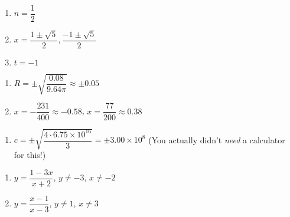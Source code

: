 \documentclass[11pt]{article}
\theoremstyle{definition}  %
\newcounter{HW}
\begin{document}
\begin{multicols}{3}
\begin{enumerate}
\setcounter{enumi}{\value{HW}}

\item $n = \dfrac{1}{2}$
\item $x = \dfrac{1 \pm \sqrt{5}}{2}, \dfrac{-1 \pm \sqrt{5}}{2}$
\item $t = -1$

\setcounter{HW}{\value{enumi}}
\end{enumerate}
\end{multicols}


\begin{multicols}{2}
\begin{enumerate}
\setcounter{enumi}{\value{HW}}


\item $R = \pm \sqrt{\dfrac{0.08}{9.64 \pi}} \approx \pm 0.05$ 
\item $x = -\dfrac{231}{400} \approx -0.58$, $x = \dfrac{77}{200} \approx 0.38$ 


\setcounter{HW}{\value{enumi}}
\end{enumerate}
\end{multicols}

\begin{enumerate}
\setcounter{enumi}{\value{HW}}
\item $c = \pm \sqrt{\dfrac{4 \cdot 6.75 \times 10^{16}}{3}} = \pm 3.00 \times 10^{8}$ (You actually didn't 
\textit{need} a calculator for this!)

\setcounter{HW}{\value{enumi}}
\end{enumerate}


\begin{multicols}{2}
\begin{enumerate}
\setcounter{enumi}{\value{HW}}


\item $y = \dfrac{1 - 3x}{x+2}$, $y \neq -3$, $x \neq -2$

\item $y = \dfrac{x-1}{x-3}$, $y \neq 1$, $x \neq 3$

\setcounter{HW}{\value{enumi}}
\end{enumerate}
\end{multicols}
\end{document}
